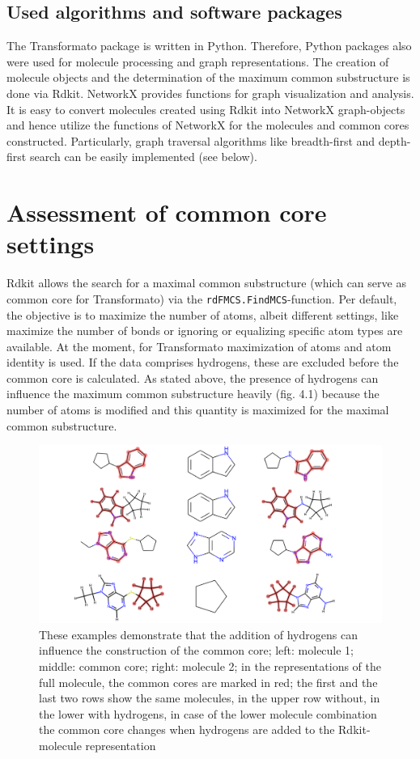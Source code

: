 \subsection{Used algorithms and software packages}

The Transformato package is written in Python. Therefore, Python packages
also were used for molecule processing and graph representations.
The creation of molecule objects and the determination of the maximum
common substructure is done via Rdkit\cite{key-3}. NetworkX\cite{AricA.Hagberg.2008}
provides functions for graph visualization and analysis. It is easy to convert molecules created using Rdkit into NetworkX graph-objects
and hence utilize the functions of NetworkX for the molecules and
common cores constructed. Particularly, graph traversal algorithms
like breadth-first and depth-first search can be easily implemented
(see below).

\section{Assessment of common core settings}

Rdkit allows the search for a maximal common substructure (which can
serve as common core for Transformato) via the \texttt{rdFMCS.FindMCS}-function.
Per default, the objective is to maximize the number of atoms, albeit
different settings, like maximize the number of bonds or ignoring
or equalizing specific atom types are available. At the moment, for
Transformato maximization of atoms and atom identity is used. If the
data comprises hydrogens, these are excluded before the common core
is calculated. As stated above, the presence of hydrogens can influence
the maximum common substructure heavily (fig. 4.1) because the number of atoms is modified and this quantity is maximized for the maximal common substructure.

\begin{figure}

\includegraphics[scale=0.35]{hydrogens_plus_minus}\caption{These examples demonstrate that the addition of hydrogens can influence the construction of the common core; left: molecule 1; middle: common core; right: molecule 2; in the representations of the full molecule, the common cores are marked in red; the first
and the last two rows show the same molecules, in the upper row without,
in the lower with hydrogens, in case of the lower molecule combination
the common core changes when hydrogens are added to the Rdkit-molecule
representation }

\end{figure}

